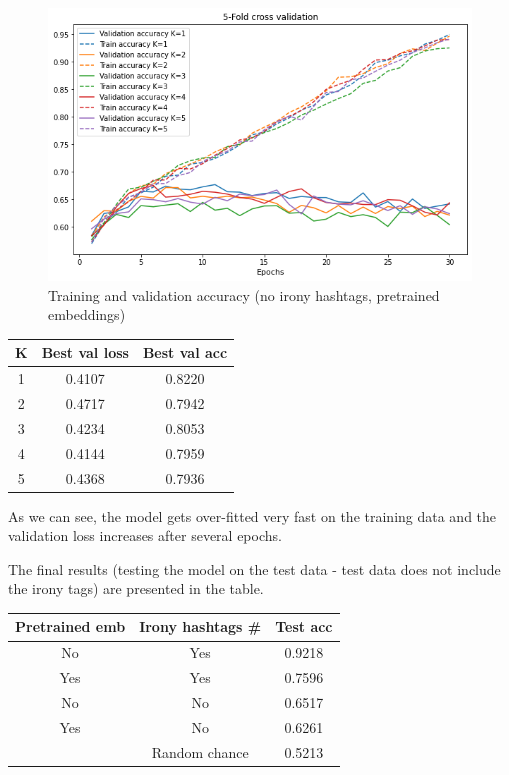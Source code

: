 \documentclass[11pt]{article}
\begin{document}
\begin{figure}[h!]
  \includegraphics[width=\columnwidth]{train_accuracy_pretrained}
  \caption{Training and validation accuracy (no irony hashtags, pretrained embeddings)}\label{fig:figure8}
\end{figure}


\begin{center}
\begin{tabular}{||c c c||}
 \hline
 K & Best val loss & Best val acc\\ [0.5ex]
 \hline\hline
 1 & 0.4107 & 0.8220 \\
 \hline
 2 & 0.4717 & 0.7942 \\
 \hline
 3 & 0.4234 & 0.8053 \\
 \hline
 4 & 0.4144 & 0.7959 \\
 \hline
 5 & 0.4368 & 0.7936 \\ [1ex]
 \hline
\end{tabular}
\end{center}

    As we can see, the model gets over-fitted very fast on the training data and the validation loss increases after several epochs.

    The final results (testing the model on the test data - test data does not include the irony tags) are presented in the table.

  \begin{center}
\begin{tabular}{||c c c||}
 \hline
 Pretrained emb & Irony hashtags \# & Test acc \\ [0.5ex]
 \hline\hline
 No & Yes & 0.9218 \\
 \hline
 Yes & Yes & 0.7596 \\
 \hline
 No & No & 0.6517 \\
 \hline
 Yes & No & 0.6261 \\
 \hline
  & Random chance & 0.5213 \\
 \hline
\end{tabular}
\end{center}
\end{document}
